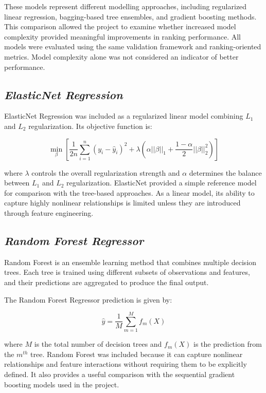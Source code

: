 \documentclass[12pt,a4paper]{report}
\begin{document}
These models represent different modelling approaches, including regularized linear regression, bagging-based tree ensembles, and gradient boosting methods. This comparison allowed the project to examine whether increased model complexity provided meaningful improvements in ranking performance. All models were evaluated using the same validation framework and ranking-oriented metrics. Model complexity alone was not considered an indicator of better performance.

\subsection{\textit{ElasticNet Regression}}
ElasticNet Regression was included as a regularized linear model combining $L_1$ and $L_2$ regularization. Its objective function is:

\begin{equation}
\min_{\beta}
\left[
\frac{1}{2n}
\sum_{i=1}^{n}
(y_i-\hat{y}_i)^2
+
\lambda
\left(
\alpha ||\beta||_1
+
\frac{1-\alpha}{2}||\beta||_2^2
\right)
\right]
\end{equation}

where $\lambda$ controls the overall regularization strength and $\alpha$ determines the balance between $L_1$ and $L_2$ regularization. ElasticNet provided a simple reference model for comparison with the tree-based approaches. As a linear model, its ability to capture highly nonlinear relationships is limited unless they are introduced through feature engineering.

\subsection{\textit{Random Forest Regressor}}
Random Forest is an ensemble learning method that combines multiple decision trees. Each tree is trained using different subsets of observations and features, and their predictions are aggregated to produce the final output.

The Random Forest Regressor prediction is given by:

\begin{equation}
\hat{y} =
\frac{1}{M}
\sum_{m=1}^{M}
f_m(X)
\end{equation}

where $M$ is the total number of decision trees and $f_m(X)$ is the prediction from the $m^{th}$ tree. Random Forest was included because it can capture nonlinear relationships and feature interactions without requiring them to be explicitly defined. It also provides a useful comparison with the sequential gradient boosting models used in the project.
\end{document}
